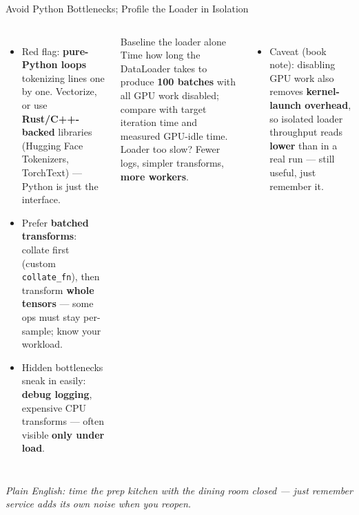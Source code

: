 \documentclass[aspectratio=169]{beamer}
\newcommand{\kw}[1]{\textbf{\textcolor{kwblue}{#1}}}
\newcommand{\pe}[1]{\par{\setlength{\fboxsep}{2.5pt}\noindent\colorbox{navy!9}{\parbox{\dimexpr\textwidth-5pt\relax}{\footnotesize\itshape Plain English: #1}}}}
\begin{document}
\begin{frame}{Avoid Python Bottlenecks; Profile the Loader in Isolation}
  \begin{columns}[t]
    \begin{itemize}\small
      \item Red flag: \kw{pure-Python loops} tokenizing lines one by one. Vectorize, or use
            \kw{Rust/C++-backed} libraries (Hugging Face Tokenizers, TorchText) --- Python is
            just the interface.
      \item Prefer \kw{batched transforms}: collate first (custom \texttt{collate\_fn}), then
            transform \kw{whole tensors} --- some ops must stay per-sample; know your workload.
      \item Hidden bottlenecks sneak in easily: \kw{debug logging}, expensive CPU transforms
            --- often visible \kw{only under load}.
    \end{itemize}
    \begin{block}{Baseline the loader alone}
      \small Time how long the DataLoader takes to produce \kw{100 batches} with all
      GPU work disabled; compare with target iteration time and measured GPU-idle time.
      Loader too slow? Fewer logs, simpler transforms, \kw{more workers}.
    \end{block}
    \begin{itemize}\small
      \item Caveat (book note): disabling GPU work also removes \kw{kernel-launch overhead},
            so isolated loader throughput reads \kw{lower} than in a real run --- still useful,
            just remember it.
    \end{itemize}
  \end{columns}
  \pe{time the prep kitchen with the dining room closed --- just remember service adds its own noise when you reopen.}
\end{frame}
\end{document}

